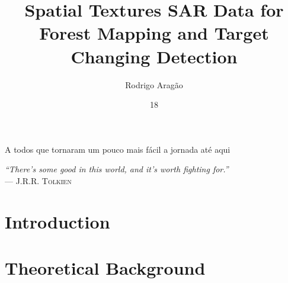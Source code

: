 \documentclass[msc, eng]{ita}    %
\author{Rodrigo Aragão}{Santos}
\title{Spatial Textures SAR Data for Forest Mapping and Target Changing Detection}
\date{18}{Novembro}{2021}
\begin{document}
\maketitle %

\begin{itadedication}
A todos que tornaram um pouco mais fácil a jornada até aqui
\end{itadedication}

\begin{itathanks}

\end{itathanks}

\thispagestyle{empty}
\ifhyperref{}\fi
\begin{flushright}
\begin{spacing}{1}
\mbox{}\vfill
{\sffamily\itshape
``There’s some good in this world, and it’s worth fighting for.''\\}
--- \textsc{J.R.R. Tolkien}
\end{spacing}
\end{flushright}

\begin{abstract}
\noindent

\end{abstract}

\begin{englishabstract}
\noindent

\end{englishabstract}

\listoffigures %


\listofabbreviations


\tableofcontents

\mainmatter

\chapter{Introduction}




\chapter{Theoretical Background}
\label{cap:intro}

\end{document}
